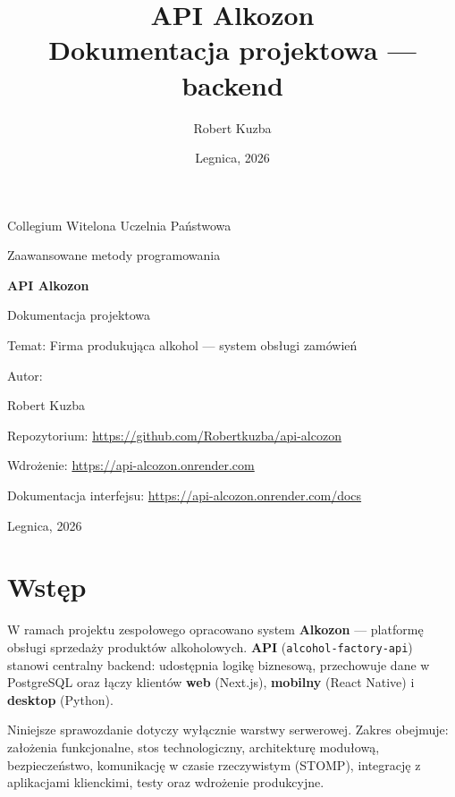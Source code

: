 \documentclass[12pt,a4paper]{report}
\title{%
  \textbf{API Alkozon}\\[0.4em]
  \large Dokumentacja projektowa --- backend
}
\author{Robert Kuzba}
\date{Legnica, 2026}
\newcommand{\blok}[1]{\needspace{9\baselineskip}#1}
\begin{document}
\begin{titlepage}
  \thispagestyle{empty}
  \centering
  \vspace*{1cm}
  {\large Collegium Witelona Uczelnia Państwowa\par}
  \vspace{0.5cm}
  {\large Zaawansowane metody programowania\par}
  \vspace{2.5cm}
  {\LARGE\bfseries API Alkozon\par}
  \vspace{0.8cm}
  {\large Dokumentacja projektowa\par}
  \vspace{0.5cm}
  {\large Temat: Firma produkująca alkohol --- system obsługi zamówień\par}
  \vfill
  {\large Autor:\par}
  {\large Robert Kuzba\par}
  \vspace{1cm}
  {\normalsize Repozytorium: \url{https://github.com/Robertkuzba/api-alcozon}\par}
  \vspace{0.5cm}
  {\normalsize Wdrożenie: \url{https://api-alcozon.onrender.com}\par}
  \vspace{0.3cm}
  {\normalsize Dokumentacja interfejsu: \url{https://api-alcozon.onrender.com/docs}\par}
  \vspace{1.5cm}
  Legnica, 2026
\end{titlepage}

\tableofcontents
\clearpage
{}

\chapter{Wstęp}

\blok{%
W ramach projektu zespołowego opracowano system \textbf{Alkozon} --- platformę obsługi sprzedaży produktów alkoholowych. \textbf{API} (\texttt{alcohol-factory-api}) stanowi centralny backend: udostępnia logikę biznesową, przechowuje dane w PostgreSQL oraz łączy klientów \textbf{web} (Next.js), \textbf{mobilny} (React Native) i \textbf{desktop} (Python).

Niniejsze sprawozdanie dotyczy wyłącznie warstwy serwerowej. Zakres obejmuje: założenia funkcjonalne, stos technologiczny, architekturę modułową, bezpieczeństwo, komunikację w czasie rzeczywistym (STOMP), integrację z aplikacjami klienckimi, testy oraz wdrożenie produkcyjne.
}
\end{document}
